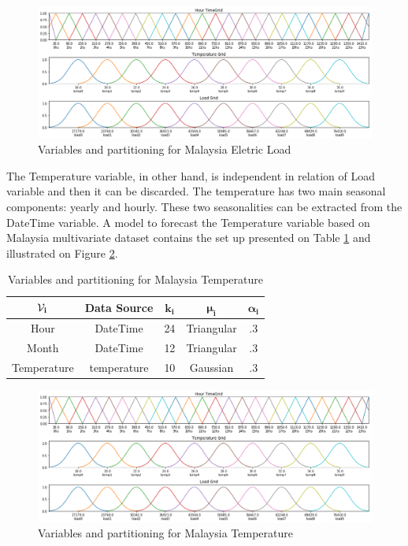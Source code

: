 \begin{figure}[htb]
    \centering
    \includegraphics[width=\textwidth]{figures/variables_malaysia.png}
    \caption{Variables and partitioning for Malaysia Eletric Load}
    \label{fig:variables_malaysia_load}
\end{figure}

The Temperature variable, in other hand, is independent in relation of Load variable and then it can be discarded. The temperature has two main seasonal components: yearly and hourly. These two seasonalities can be extracted from the DateTime variable.  A model to forecast the Temperature variable based on Malaysia multivariate dataset contains the set up presented on Table \ref{tab:variables_malaysia_temperature} and illustrated on Figure \ref{fig:variables_malaysia_temperature}.

\begin{table}[htb]
    \centering
    \begin{tabular}{|c|c|c|c|c|} \hline
        $\mathbf{\mathcal{V}_i}$ & \textbf{Data Source} & $\mathbf{k_i}$ & $\mathbf{\mu_i}$ & $\mathbf{\alpha_i}$  \\ \hline
        Hour & DateTime & 24 & Triangular & .3 \\ \hline 
        Month & DateTime & 12 & Triangular & .3 \\ \hline 
        Temperature & temperature & 10 & Gaussian & .3 \\ \hline 
    \end{tabular}
    \caption{Variables and partitioning for Malaysia Temperature}
    \label{tab:variables_malaysia_temperature}
\end{table}

\begin{figure}[htb]
    \centering
    \includegraphics[width=\textwidth]{figures/variables_malaysia.png}
    \caption{Variables and partitioning for Malaysia Temperature}
    \label{fig:variables_malaysia_temperature}
\end{figure}

